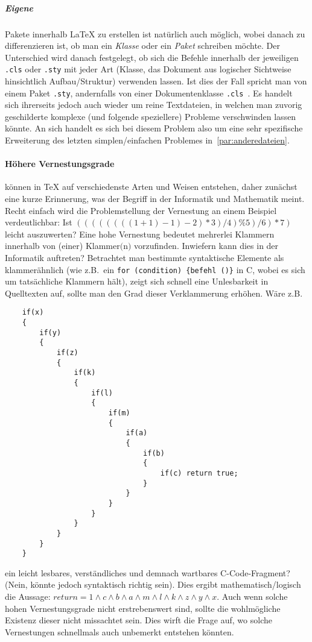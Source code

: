 \subparagraph*{Eigene}Pakete innerhalb \LaTeX{} zu erstellen ist natürlich auch möglich, wobei danach zu differenzieren ist, ob man ein \textit{Klasse} oder ein \textit{Paket} schreiben möchte. Der Unterschied wird danach festgelegt, ob sich die Befehle innerhalb der jeweiligen \texttt{.cls} oder \texttt{.sty} mit jeder Art (Klasse, das Dokument aus logischer Sichtweise hinsichtlich Aufbau/Struktur) verwenden lassen. Ist dies der Fall spricht man von einem Paket \texttt{.sty}, andernfalls von einer Dokumentenklasse \texttt{.cls}~\citep{latex:documentation:clsguide}. Es handelt sich ihrerseits jedoch auch wieder um reine Textdateien, in welchen man zuvorig geschilderte komplexe (und folgende speziellere) Probleme verschwinden lassen könnte. An sich handelt es sich bei diesem Problem also um eine sehr spezifische Erweiterung des letzten simplen/einfachen Problemes in~\ref{par:anderedateien}.


\paragraph*{Höhere Vernestungsgrade}%
können in \TeX{} auf verschiedenste Arten und Weisen entstehen, daher zunächst eine kurze Erinnerung, was der Begriff in der Informatik und Mathematik meint. Recht einfach wird die Problemstellung der Vernestung an einem Beispiel verdeutlichbar: Ist $((((((((1+1)-1)-2)*3)/4)\% 5)/6)*7)$ leicht auszuwerten? Eine hohe Vernestung bedeutet mehrerlei Klammern innerhalb von (einer) Klammer$($n$)$ vorzufinden. Inwiefern kann dies in der Informatik auftreten? Betrachtet man bestimmte syntaktische Elemente als klammerähnlich (wie z.B.\ ein \texttt{for (condition) \{befehl~()\}} in C, wobei es sich um tatsächliche Klammern hält), zeigt sich schnell eine Unlesbarkeit in Quelltexten auf, sollte man den Grad dieser Verklammerung erhöhen. Wäre z.B.\ 
\begin{verbatim}
    if(x)
    {
        if(y)
        {
            if(z)
            {
                if(k)
                {
                    if(l)
                    {
                        if(m)
                        {
                            if(a)
                            {
                                if(b)
                                {
                                    if(c) return true;
                                }
                            }
                        }
                    }
                }
            }
        }
    }
\end{verbatim}
ein leicht lesbares, verständliches und demnach wartbares C-Code-Fragment? (Nein, könnte jedoch syntaktisch richtig sein). Dies ergibt mathematisch/logisch die Aussage: $return=1\land c\land b\land a\land m\land l\land k\land z\land y\land x$. Auch wenn solche hohen Vernestungsgrade nicht erstrebenswert sind, sollte die wohlmögliche Existenz dieser nicht missachtet sein. Dies wirft die Frage auf, wo solche Vernestungen schnellmals auch unbemerkt entstehen könnten.

